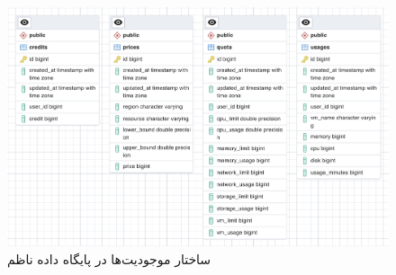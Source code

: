\begin{figure}
	\centering
	\includegraphics[width=\linewidth]{figures/erd-nazem}
	\caption{ساختار موجودیت‌ها در پایگاه داده ناظم}
	\label{fig:erd-nazem}
\end{figure}

